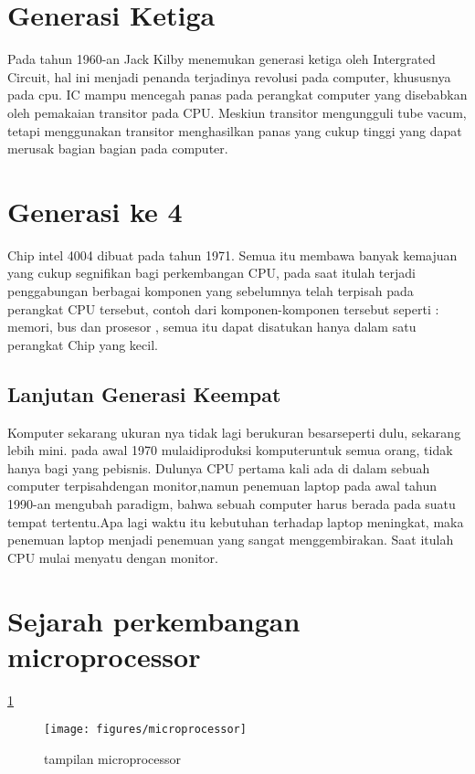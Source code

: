  	\section{Generasi Ketiga}
 Pada tahun 1960-an Jack Kilby menemukan generasi ketiga oleh Intergrated Circuit, hal ini menjadi penanda terjadinya revolusi pada computer, khususnya pada cpu. IC mampu mencegah panas pada perangkat computer yang disebabkan oleh pemakaian transitor pada CPU.
 Meskiun transitor mengungguli tube vacum, tetapi menggunakan transitor menghasilkan panas yang cukup tinggi yang dapat merusak bagian bagian pada computer. 

 	\section{Generasi ke 4}
 Chip intel 4004 dibuat pada tahun 1971. Semua itu membawa banyak kemajuan yang cukup segnifikan bagi perkembangan CPU, pada saat itulah terjadi  penggabungan  berbagai komponen yang sebelumnya telah terpisah pada perangkat CPU tersebut, contoh dari komponen-komponen tersebut seperti : memori, bus dan prosesor , semua itu dapat disatukan hanya dalam satu perangkat Chip yang kecil.
	\subsection{Lanjutan Generasi Keempat}
 Komputer sekarang ukuran nya tidak lagi berukuran besarseperti dulu, sekarang lebih mini. pada awal 1970 mulaidiproduksi komputeruntuk semua orang, tidak hanya bagi yang pebisnis.
 Dulunya CPU pertama kali ada di dalam sebuah computer terpisahdengan monitor,namun penemuan laptop pada awal tahun 1990-an mengubah paradigm, bahwa sebuah computer harus berada pada suatu tempat tertentu.Apa lagi waktu itu kebutuhan terhadap laptop meningkat, maka penemuan laptop menjadi penemuan yang sangat menggembirakan. Saat itulah CPU mulai menyatu dengan monitor.


 \section{Sejarah perkembangan microprocessor}
 	\ref{microprocessor}


 	\begin{figure}[ht]
\centerline{\texttt{[image: figures/microprocessor]}}
\caption{tampilan microprocessor}
\label{microprocessor}
\end{figure}
